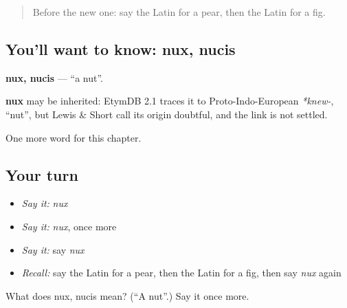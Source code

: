 \begin{quote}
Before the new one: say the Latin for a pear, then the Latin for a fig.
\end{quote}

\subsection*{You'll want to know: nux, nucis}
\textbf{nux, nucis} — \textquotedblleft{}a nut\textquotedblright{}.

\begin{cousinweb}
\textbf{nux} may be inherited: EtymDB 2.1 traces it to Proto-Indo-European \emph{*knew-}, \textquotedblleft{}nut\textquotedblright{}, but Lewis \& Short call its origin doubtful, and the link is not settled.
\end{cousinweb}

\begin{grammarlens}[title={What you've built}]
One more word for this chapter.
\end{grammarlens}

\subsection*{Your turn}
\begin{itemize}
\raggedright
  \item \emph{Say it:} \emph{nux}
  \item \emph{Say it:} \emph{nux}, once more
  \item \emph{Say it:} say \emph{nux}
  \item \emph{Recall:} say the Latin for a pear, then the Latin for a fig, then say \emph{nux} again
\end{itemize}

\begin{tcolorbox}[breakable,colback=teal!4,colframe=teal!35!black,title={Before you move on}]
What does nux, nucis mean? (\textquotedblleft{}A nut\textquotedblright{}.) Say it once more.
\end{tcolorbox}
